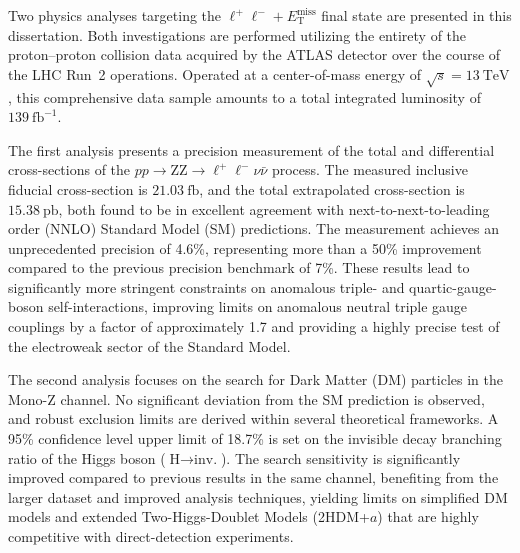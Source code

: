 





Two physics analyses targeting the $\ell^+\ell^- + E_{\text{T}}^{\text{miss}}$ final state are presented in this dissertation. Both investigations are performed utilizing the entirety of the proton--proton collision data acquired by the ATLAS detector over the course of the LHC Run~2 operations. Operated at a center-of-mass energy of $\sqrt{s}=13~\text{TeV}$, this comprehensive data sample amounts to a total integrated luminosity of $139~\text{fb}^{-1}$.

The first analysis presents a precision measurement of the total and differential cross-sections of the $pp \to \text{ZZ} \to \ell^+\ell^-\nu\bar{\nu}$ process. 
The measured inclusive fiducial cross-section is $21.03~\text{fb}$, and the total extrapolated cross-section is $15.38~\text{pb}$, both found to be in excellent agreement with next-to-next-to-leading order (NNLO) Standard Model (SM) predictions. The measurement achieves an unprecedented precision of 4.6\%, representing more than a 50\% improvement compared to the previous precision benchmark of 7\%. 
These results lead to significantly more stringent constraints on anomalous triple- and quartic-gauge-boson self-interactions, improving limits on anomalous neutral triple gauge couplings by a factor of approximately 1.7 and providing a highly precise test of the electroweak sector of the Standard Model.

The second analysis focuses on the search for Dark Matter (DM) particles in the Mono-$\text{Z}$ channel. 
No significant deviation from the SM prediction is observed, and robust exclusion limits are derived within several theoretical frameworks. A 95\% confidence level upper limit of 18.7\% is set on the invisible decay branching ratio of the Higgs boson ($\text{H} \to \text{inv.}$). 
The search sensitivity is significantly improved compared to previous results in the same channel, benefiting from the larger dataset and improved analysis techniques, yielding limits on simplified DM models and extended Two-Higgs-Doublet Models (2HDM+$a$) that are highly competitive with direct-detection experiments.

